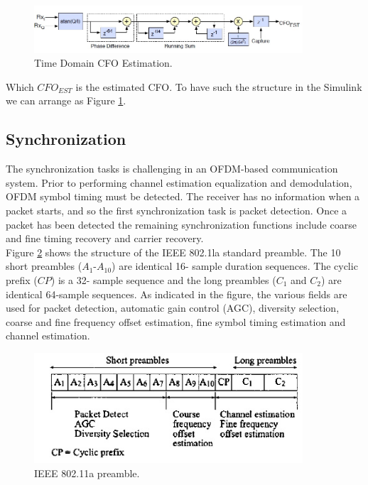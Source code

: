 \begin{figure}[h!]
\centering
\includegraphics[width=10cm]{content/fig/cfo_est.JPG}
\caption{Time Domain CFO Estimation.}
\label{fig:cfo_est}
\end{figure}

Which $CFO_{EST}$ is the estimated CFO. To have such the structure in the Simulink we can arrange as Figure \ref{fig:cfo_est}.

\subsection{Synchronization}
\label{section:sync}

The synchronization tasks is challenging in an OFDM-based communication system. Prior to performing channel estimation equalization and demodulation, OFDM symbol timing must be detected. The receiver has no information when a packet starts, and so the first synchronization task is packet detection. Once a packet has been detected the remaining synchronization functions include coarse and fine timing recovery and carrier recovery.\\
Figure \ref{fig:ieee_preamble} shows the structure of the IEEE 802.1la standard preamble. The 10 short preambles ($A_{1}$-$A_{10}$) are identical 16- sample duration sequences. The cyclic prefix ($CP$) is a 32- sample sequence and the long preambles ($C_{1}$ and $C_{2}$) are identical 64-sample sequences. As indicated in the figure, the various fields are used for packet detection, automatic gain control (AGC), diversity selection, coarse and fine frequency offset estimation, fine symbol timing estimation and channel estimation.\\

\begin{figure}[h!]
\centering
\includegraphics[width=10cm]{content/fig/ieee_preamble.JPG}
\caption{IEEE 802.11a preamble.}
\label{fig:ieee_preamble}
\end{figure}

